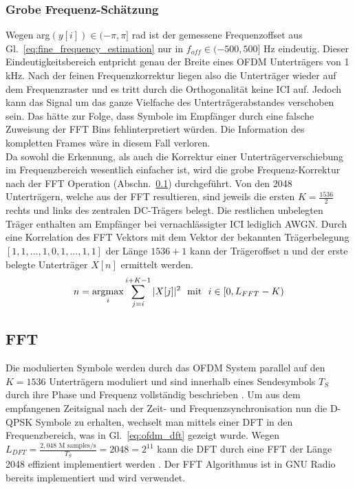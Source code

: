 \subsubsection{Grobe Frequenz-Schätzung}
Wegen arg$(y[i]) \in (-\pi,\pi]$ rad ist der gemessene Frequenzoffset aus Gl.~\ref{eq:fine_frequency_estimation} nur in $f_{off} \in (-500,500]$ Hz eindeutig. Dieser Eindeutigkeitsbereich entpricht genau der Breite eines OFDM Unterträgers von 1 kHz. Nach der feinen Frequenzkorrektur liegen also die Unterträger wieder auf dem Frequenzraster und es tritt durch die Orthogonalität keine ICI auf. Jedoch kann das Signal um das ganze Vielfache des Unterträgerabstandes verschoben sein. Das hätte zur Folge, dass Symbole im Empfänger durch eine falsche Zuweisung der FFT Bins fehlinterpretiert würden. Die Information des kompletten Frames wäre in diesem Fall verloren.\\
Da sowohl die Erkennung, als auch die Korrektur einer Unterträgerverschiebung im Frequenzbereich wesentlich einfacher ist, wird die grobe Frequenz-Korrektur nach der FFT Operation (Abschn.~\ref{sec:FFT}) durchgeführt.
Von den 2048 Unterträgern, welche aus der FFT resultieren, sind jeweils die ersten $K = \frac{1536}{2}$ rechts und links des zentralen DC-Trägers belegt. Die restlichen unbelegten Träger enthalten am Empfänger bei vernachlässigter \ac{ICI} lediglich \ac{AWGN}. Durch eine Korrelation des FFT Vektors mit dem Vektor der bekannten Trägerbelegung $[1,1,...,1,0,1,...,1,1]$ der Länge $1536+1$ kann der Trägeroffset n und der erste belegte Unterträger $X[n]$ ermittelt werden.
\begin{equation}
n = \operatorname*{\arg\!\max}_i \sum \limits_{j=i}^{i+K-1} |X[j]|^2 \ \ \text{mit} \ \ i \in [0,L_{FFT}-K)
\end{equation}

\subsection{FFT}
\label{sec:FFT}
Die modulierten Symbole werden durch das OFDM System parallel auf den $K=1536$ Unterträgern moduliert und sind innerhalb eines Sendesymbols $T_S$ durch ihre Phase und Frequenz vollständig beschrieben \cite{nt1}. Um aus dem empfangenen Zeitsignal nach der Zeit- und Frequenzsynchronisation nun die D-QPSK Symbole zu erhalten, wechselt man mittels einer \ac{DFT} in den Frequenzbereich, was in Gl.~\ref{eq:ofdm_dft} gezeigt wurde. Wegen $L_{DFT} = \frac{2,048 \text{ M samples/s}}{T_S} = 2048 = 2^{11}$ kann die \ac{DFT} durch eine \ac{FFT} der Länge 2048 effizient implementiert werden \cite{fft:sus}. Der \ac{FFT} Algorithmus ist in GNU Radio \cite{repo:gr-fft} bereits implementiert und wird verwendet.

